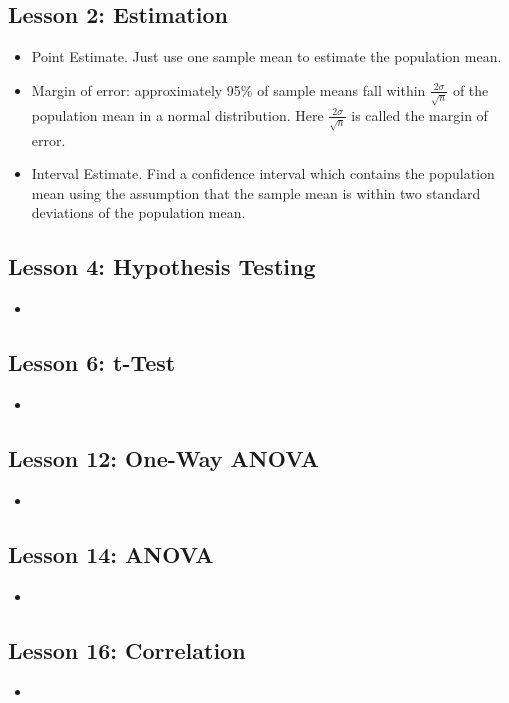 \documentclass[twoside,12pt]{article}
\begin{document}
\subsection{Lesson 2: Estimation}
\begin{itemize}
\item Point Estimate. Just use one sample mean to estimate the population mean.
\item Margin of error: approximately 95\% of sample means fall within $\frac{2\sigma}{\sqrt{n}}$ of the population mean in a normal distribution. Here $\frac{2\sigma}{\sqrt{n}}$ is called the margin of error. 
\item Interval Estimate. Find a confidence interval which contains the population mean using the assumption that the sample mean is within two standard deviations of the population mean. 
\end{itemize}

\subsection{Lesson 4: Hypothesis Testing}
\begin{itemize}
\item 
\end{itemize}

\subsection{Lesson 6: t-Test}
\begin{itemize}
\item 
\end{itemize}

\subsection{Lesson 12: One-Way ANOVA}
\begin{itemize}
\item 
\end{itemize}

\subsection{Lesson 14: ANOVA}
\begin{itemize}
\item 
\end{itemize}

\subsection{Lesson 16: Correlation}
\begin{itemize}
\item 
\end{itemize}
\end{document}
